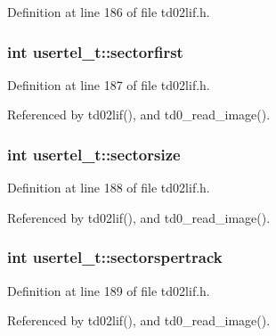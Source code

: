 Definition at line 186 of file td02lif.\+h.

\subsubsection[{\texorpdfstring{sectorfirst}{sectorfirst}}]{\setlength{\rightskip}{0pt plus 5cm}int usertel\+\_\+t\+::sectorfirst}\hypertarget{structusertel__t_ad81d010c171bf6f05db6c656d14529a3}{}\label{structusertel__t_ad81d010c171bf6f05db6c656d14529a3}


Definition at line 187 of file td02lif.\+h.



Referenced by td02lif(), and td0\+\_\+read\+\_\+image().

\subsubsection[{\texorpdfstring{sectorsize}{sectorsize}}]{\setlength{\rightskip}{0pt plus 5cm}int usertel\+\_\+t\+::sectorsize}\hypertarget{structusertel__t_a9f850738ca0fc170eb719a66a2342063}{}\label{structusertel__t_a9f850738ca0fc170eb719a66a2342063}


Definition at line 188 of file td02lif.\+h.



Referenced by td02lif(), and td0\+\_\+read\+\_\+image().

\subsubsection[{\texorpdfstring{sectorspertrack}{sectorspertrack}}]{\setlength{\rightskip}{0pt plus 5cm}int usertel\+\_\+t\+::sectorspertrack}\hypertarget{structusertel__t_a9a41e0e32661461716e600aa48b902c8}{}\label{structusertel__t_a9a41e0e32661461716e600aa48b902c8}


Definition at line 189 of file td02lif.\+h.



Referenced by td02lif(), and td0\+\_\+read\+\_\+image().

